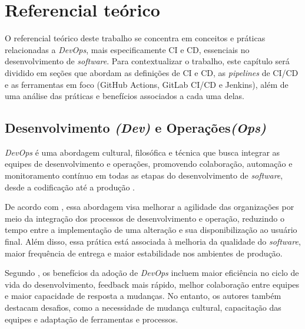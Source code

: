 \chapter{Referencial te\'orico}\label{cap:referencialTeorico}

O referencial teórico deste trabalho se concentra em conceitos e práticas relacionadas a \textit{DevOps}, mais especificamente CI e CD, essenciais no desenvolvimento de \textit{software}. Para contextualizar o trabalho, este capítulo será dividido em seções que abordam as definições de CI e CD, as \textit{pipelines} de CI/CD e as ferramentas em foco (GitHub Actions, GitLab CI/CD e Jenkins), além de uma análise das práticas e benefícios associados a cada uma delas.

\section{Desenvolvimento \textit{(Dev)} e Operações\textit{(Ops)}}\label{sec:devops}

\textit{DevOps} é uma abordagem cultural, filosófica e técnica que busca integrar as equipes de desenvolvimento e operações, promovendo colaboração, automação e monitoramento contínuo em todas as etapas do desenvolvimento de \textit{software}, desde a codificação até a produção \cite{AWS2024}.

De acordo com \cite{Bass2020}, essa abordagem visa melhorar a agilidade das organizações por meio da integração dos processos de desenvolvimento e operação, reduzindo o tempo entre a implementação de uma alteração e sua disponibilização ao usuário final. Além disso, essa prática está associada à melhoria da qualidade do \textit{software}, maior frequência de entrega e maior estabilidade nos ambientes de produção.

Segundo \cite{RiunguKalliosaari2016}, os benefícios da adoção de \textit{DevOps} incluem maior eficiência no ciclo de vida do desenvolvimento, feedback mais rápido, melhor colaboração entre equipes e maior capacidade de resposta a mudanças. No entanto, os autores também destacam desafios, como a necessidade de mudança cultural, capacitação das equipes e adaptação de ferramentas e processos.

